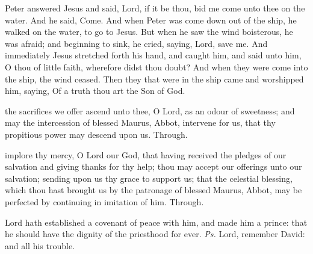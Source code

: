 \tractnotice


 Peter answered Jesus and said, Lord, if it be thou, bid me come unto thee on the water. And he said, Come. And when Peter was come down out of the ship, he walked on the water, to go to Jesus. But when he saw the wind boisterous, he was afraid; and beginning to sink, he cried, saying, Lord, save me. And immediately Jesus stretched forth his hand, and caught him, and said unto him, O thou of little faith, wherefore didst thou doubt? And when they were come into the ship, the wind ceased. Then they that were in the ship came and worshipped him, saying, Of a truth thou art the Son of God.


\secret
{} the sacrifices we offer ascend unto thee, O Lord, as an odour of sweetness; and may the intercession of blessed Maurus, Abbot, intervene for us, that thy propitious power may descend upon us. Through.


\postcommunion
{} implore thy mercy, O Lord our God, that having received the pledges of our salvation and giving thanks for thy help; thou may accept our offerings unto our salvation; sending upon us thy grace to support us; that the celestial blessing, which thou hast brought us by the patronage of blessed Maurus, Abbot, may be perfected by continuing in imitation of him. Through.



\introit
{} Lord hath established a covenant of peace with him, and made him a prince: that he should have the dignity of the priesthood for ever. \textit{Ps.} Lord, remember David: and all his trouble.

